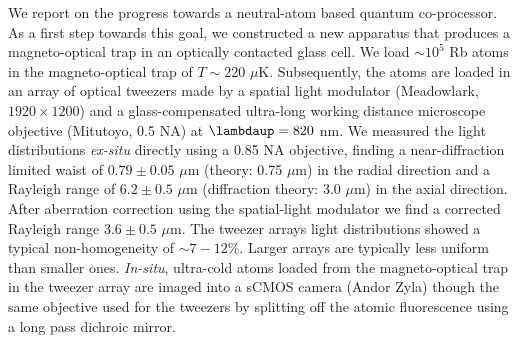 \noindent We report on the progress towards a neutral-atom based quantum co-processor.
As a first step towards this goal, we constructed a new apparatus that produces a magneto-optical trap in an optically contacted glass cell. 
We load $\sim 10^5$ Rb atoms in the magneto-optical trap of $T\sim220$ $\mu$K.
Subsequently, the atoms are loaded in an array of optical tweezers made by a spatial light modulator (Meadowlark, $1920 \times 1200$) and a glass-compensated ultra-long working distance microscope objective (Mitutoyo, 0.5 NA) at $\lambdaup = 820$ nm.
We measured the light distributions \textit{ex-situ} directly using a 0.85 NA objective, finding a near-diffraction limited waist of $0.79\pm0.05$ $\mu$m (theory: 0.75 $\mu$m) in the radial direction and a Rayleigh range of $6.2 \pm 0.5$ $\mu$m (diffraction theory: 3.0 $\mu$m) in the axial direction.
After aberration correction using the spatial-light modulator we find a corrected Rayleigh range $3.6\pm0.5$ $\mu$m.
The tweezer arrays light distributions showed a typical non-homogeneity of $\sim 7-12\%$.
Larger arrays are typically less uniform than smaller ones. 
\textit{In-situ}, ultra-cold atoms loaded from the magneto-optical trap in the tweezer array are imaged into a sCMOS camera (Andor Zyla) though the same objective used for the tweezers by splitting off the atomic fluorescence using a long pass dichroic mirror.
